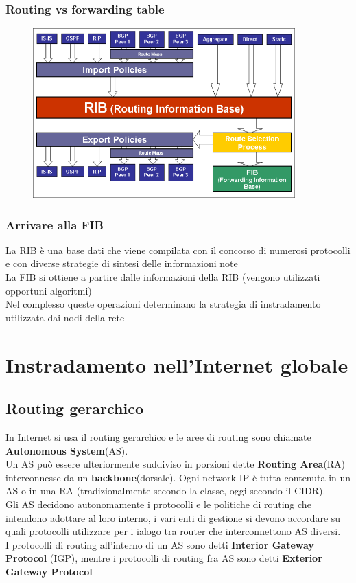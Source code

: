 \documentclass{report}
\begin{document}
            \subsection{Routing vs forwarding table}
                \begin{figure}[H]
                    \includegraphics[width=0.9\textwidth]{3/vs.png}
                \end{figure}
            \subsection{Arrivare alla FIB}
                La RIB è una base dati che viene compilata con il concorso di numerosi protocolli e con diverse strategie di sintesi delle informazioni note
                \\
                La FIB si ottiene a partire dalle informazioni della RIB (vengono utilizzati opportuni algoritmi)
                \\
                Nel complesso queste operazioni determinano la strategia di instradamento utilizzata dai nodi della rete
    \chapter{Instradamento nell'Internet globale}
        \section{Routing gerarchico}
            In Internet si usa il routing gerarchico e le aree di routing sono chiamate \textbf{Autonomous System}(AS).
            \\
            Un AS può essere ulteriormente suddiviso in porzioni dette \textbf{Routing Area}(RA) interconnesse da un \textbf{backbone}(dorsale). Ogni network IP è tutta contenuta in un AS o in una RA (tradizionalmente secondo la classe, oggi secondo il CIDR).
            \\
            Gli AS decidono autonomamente i protocolli e le politiche di routing che intendono adottare al loro interno, i vari enti di gestione si devono accordare su quali protocolli utilizzare per i ialogo tra router che interconnettono AS diversi.
            \\
            I protocolli di routing all'interno di un AS sono detti \textbf{Interior Gateway Protocol} (IGP), mentre i protocolli di routing fra AS sono detti \textbf{Exterior Gateway Protocol}
\end{document}
